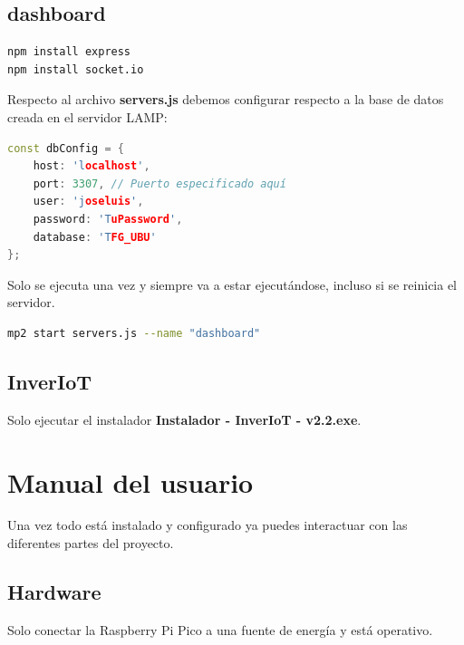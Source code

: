 \subsection{dashboard}

\begin{lstlisting}[language=sh, firstnumber=0, basicstyle=\normalsize, caption={Instalaciones necesarias.}] 
npm install express
npm install socket.io
\end{lstlisting}

Respecto al archivo \textbf{servers.js} debemos configurar respecto a la base de datos creada en el servidor LAMP:

\begin{lstlisting}[language=cpp, firstnumber=0, basicstyle=\normalsize, caption={Configuración de base de datos.}] 
const dbConfig = {
    host: 'localhost',
    port: 3307, // Puerto especificado aquí
    user: 'joseluis',
    password: 'TuPassword',
    database: 'TFG_UBU'
};
\end{lstlisting}

Solo se ejecuta una vez y siempre va a estar ejecutándose, incluso si se reinicia el servidor.

\begin{lstlisting}[language=sh, firstnumber=0, basicstyle=\normalsize, caption={Ejecución.}] 
mp2 start servers.js --name "dashboard"
\end{lstlisting}

\subsection{InverIoT}
Solo ejecutar el instalador \textbf{Instalador - InverIoT - v2.2.exe}.

\section{Manual del usuario}

Una vez todo está instalado y configurado ya puedes interactuar con las diferentes partes del proyecto.

\subsection{Hardware}
Solo conectar la Raspberry Pi Pico a una fuente de energía y está operativo.

